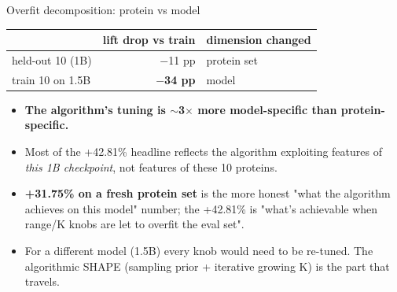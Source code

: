 \documentclass[aspectratio=169,11pt]{beamer}
\begin{document}
\begin{frame}{Overfit decomposition: protein vs model}
  \begin{center}\Large
    \begin{tabular}{lrl}
      \toprule
       & lift drop vs train & dimension changed \\
      \midrule
      held-out 10 (1B)       & {\color{green}$-$11 pp}  & protein set \\
      train 10 on 1.5B       & {\color{red}\textbf{$-$34 pp}} & model \\
      \bottomrule
    \end{tabular}
  \end{center}
  \vspace{0.8em}
  \begin{itemize}
    \setlength\itemsep{0.4em}
    \item \textbf{The algorithm's tuning is $\sim$3$\times$
          more model-specific than protein-specific.}
    \item Most of the +42.81\% headline reflects the algorithm
          exploiting features of \emph{this 1B checkpoint},
          not features of these 10 proteins.
    \item \textbf{+31.75\% on a fresh protein set} is the more honest
          "what the algorithm achieves on this model" number; the
          +42.81\% is "what's achievable when range/K knobs are let
          to overfit the eval set".
    \item For a different model (1.5B) every knob would need to be
          re-tuned. The algorithmic SHAPE (sampling prior + iterative
          growing K) is the part that travels.
  \end{itemize}
\end{frame}
\end{document}

